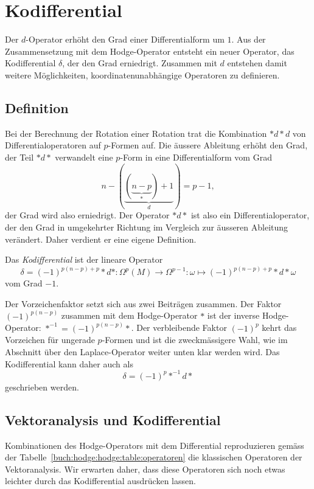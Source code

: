 %
%
%
\section{Kodifferential}
Der $d$-Operator erhöht den Grad einer Differentialform um $1$.
Aus der Zusammensetzung mit dem Hodge-Operator entsteht ein neuer
Operator, das Kodifferential $\delta$, der den Grad erniedrigt.
Zusammen mit $d$ entstehen damit weitere Möglichkeiten,
koordinatenunabhängige Operatoren zu definieren.

%
%
\subsection{Definition}
Bei der Berechnung der Rotation einer Rotation trat die Kombination
${*}d{*}d$ von Differentialoperatoren auf $p$-Formen auf.
Die äussere Ableitung erhöht den Grad, der Teil ${*}d{*}$
verwandelt eine $p$-Form in eine Differentialform vom Grad
\[
n-(\underbrace{(\underbrace{n-p}_{*})+1}_{d})
=
p-1,
\]
der Grad wird also erniedrigt.
Der Operator ${*}d{*}$ ist also ein Differentialoperator, der den
Grad in umgekehrter Richtung im Vergleich zur äusseren Ableitung
verändert.
Daher verdient er eine eigene Definition.

\begin{definition}[Kodifferential]
\label{buch:hodge:kodifferential:def:delta}
Das {\em Kodifferential} ist der lineare Operator
\[
\delta
=
(-1)^{p(n-p)+p}
{\ast}d{\ast}
\colon
\Omega^p(M)\to\Omega^{p-1}
:
\omega \mapsto (-1)^{p(n-p)+p}{\ast}d{\ast}\omega
\]
vom Grad $-1$.
\end{definition}

Der Vorzeichenfaktor setzt sich aus zwei Beiträgen zusammen.
Der Faktor $(-1)^{p(n-p)}$ zusammen mit dem Hodge-Operator ${\ast}$
ist der inverse Hodge-Operator: $\ast^{-1} = (-1)^{p(n-p)}{\ast}$.
Der verbleibende Faktor $(-1)^p$ kehrt das Vorzeichen für ungerade
$p$-Formen und ist die zweckmässigere Wahl, wie im Abschnitt über
den Laplace-Operator weiter unten klar werden wird.
Das Kodifferential kann daher auch als
\[
\delta
=
(-1)^p
{\ast}^{-1}d{\ast}
\]
geschrieben werden.

%
%
\subsection{Vektoranalysis und Kodifferential}
Kombinationen des Hodge-Operators mit dem Differential reproduzieren
gemäss der Tabelle~\ref{buch:hodge:hodge:table:operatoren} die 
klassischen Operatoren der Vektoranalysis.
Wir erwarten daher, dass diese Operatoren sich noch etwas leichter
durch das Kodifferential ausdrücken lassen.

